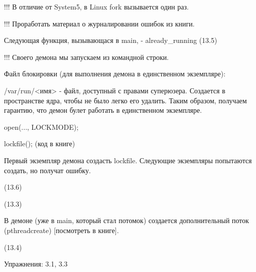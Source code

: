 \documentclass[a4paper, 14pt]{report}
\begin{document}
	!!! В отличие от System5, в Linux fork вызывается один раз.
	
	!!! Проработать материал о журналировании ошибок из книги.
	
	Следующая функция, вызывающася в main, - already\_running (13.5)
	
	!!! Своего демона мы запускаем из командной строки.
	
	Файл блокировки (для выполнения демона в единственном экземпляре):
	
	/var/run/<имя> - файл, доступный с правами суперюзера. Создается в пространстве ядра, чтобы не было легко его удалить. Таким образом, получаем гарантию, что демон булет работать в единственном экземпляре.
	
	open(..., LOCKMODE);
	
	lockfile(); (код в книге)
	
	Первый экземпляр демона создасть lockfile. Следующие экземпляры попытаются создать, но получат ошибку.
	
	(13.6)
	
	(13.3)
	
	В демоне (уже в main, который стал потомок) создается дополнительный поток (pthreadcreate) [посмотреть в книге].
	
	(13.4)
	
	Упражнения: 3.1, 3.3
\end{document}
